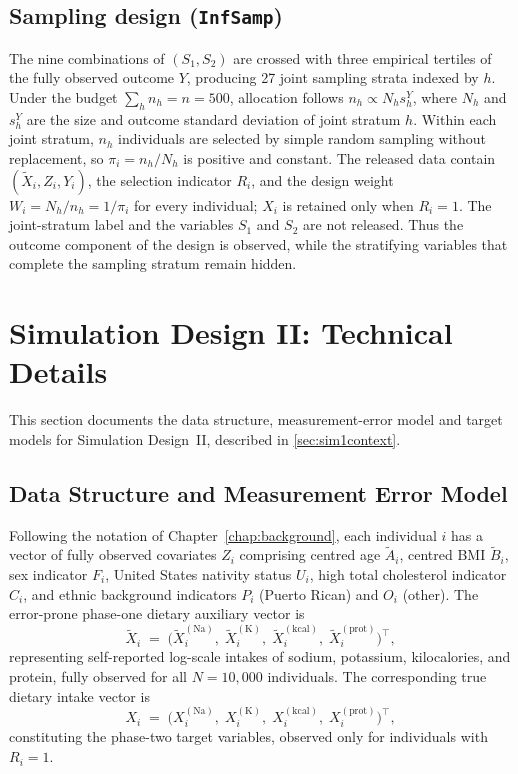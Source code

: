 \subsection{Sampling design (\texttt{InfSamp})}

The nine combinations of $(S_1,S_2)$ are crossed with three empirical tertiles of the fully observed outcome $Y$, producing 27 joint sampling strata indexed by $h$. Under the budget $\sum_h n_h=n=500$, allocation follows $n_h\propto N_hs_h^Y$, where $N_h$ and $s_h^Y$ are the size and outcome standard deviation of joint stratum $h$. Within each joint stratum, $n_h$ individuals are selected by simple random sampling without replacement, so $\pi_i=n_h/N_h$ is positive and constant. The released data contain $(\tilde{X}_i,Z_i,Y_i)$, the selection indicator $R_i$, and the design weight $W_i=N_h/n_h=1/\pi_i$ for every individual; $X_i$ is retained only when $R_i=1$. The joint-stratum label and the variables $S_1$ and $S_2$ are not released. Thus the outcome component of the design is observed, while the stratifying variables that complete the sampling stratum remain hidden.

\section{Simulation Design II: Technical Details}
\label{app:sim1}
This section documents the data structure, measurement-error model and target models for Simulation Design~II, described in \ref{sec:sim1context}.
\subsection{Data Structure and Measurement Error Model}
\label{app:sim1_data}

Following the notation of Chapter~\ref{chap:background}, each individual $i$ has a vector of fully observed covariates $Z_i$ comprising centred age $\tilde{A}_i$, centred BMI $\tilde{B}_i$, sex indicator $F_i$, United States nativity status $U_i$, high total cholesterol indicator $C_i$, and ethnic background indicators $P_i$ (Puerto Rican) and $O_i$ (other). The error-prone phase-one dietary auxiliary vector is
\begin{equation}
    \tilde{X}_i \;=\; \bigl(
        \tilde{X}_i^{(\mathrm{Na})},\;
        \tilde{X}_i^{(\mathrm{K})},\;
        \tilde{X}_i^{(\mathrm{kcal})},\;
        \tilde{X}_i^{(\mathrm{prot})}
    \bigr)^{\top},
    \label{eq:app_phase1_aux}
\end{equation}
representing self-reported log-scale intakes of sodium, potassium, kilocalories, and protein, fully observed for all $N = 10{,}000$ individuals. The corresponding true dietary intake vector is
\begin{equation}
    X_i \;=\; \bigl(
        X_i^{(\mathrm{Na})},\;
        X_i^{(\mathrm{K})},\;
        X_i^{(\mathrm{kcal})},\;
        X_i^{(\mathrm{prot})}
    \bigr)^{\top},
    \label{eq:app_phase2_target}
\end{equation}
constituting the phase-two target variables, observed only for individuals with $R_i = 1$.

